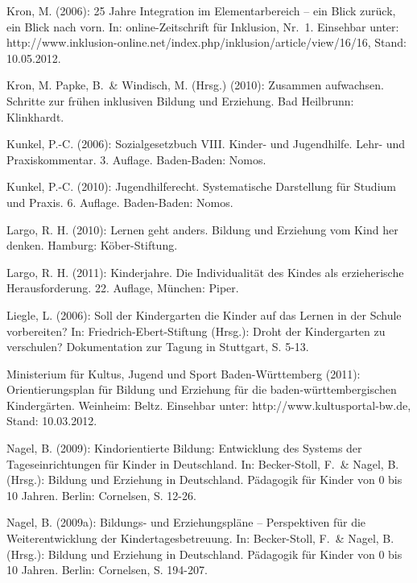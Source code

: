 Kron, M. (2006): 25 Jahre Integration im Elementarbereich – ein Blick zurück, ein Blick nach vorn. In: online-Zeitschrift für Inklusion, Nr.~1. Einsehbar unter: http://www.inklusion-online.net/index.php/inklusion/article/view/16/16, Stand: 10.05.2012.

Kron, M. Papke, B.~\& Windisch, M. (Hrsg.) (2010): Zusammen aufwachsen. Schritte zur frühen inklusiven Bildung und Erziehung. Bad Heilbrunn: Klinkhardt.

Kunkel, P.-C. (2006): Sozialgesetzbuch VIII. Kinder- und Jugendhilfe. Lehr- und Praxiskommentar. 3. Auflage. Baden-Baden: Nomos. 

Kunkel, P.-C. (2010): Jugendhilferecht. Systematische Darstellung für Studium und Praxis. 6. Auflage. Baden-Baden: Nomos. 

Largo, R. H. (2010): Lernen geht anders. Bildung und Erziehung vom Kind her denken. Hamburg: Köber-Stiftung. 

Largo, R. H. (2011): Kinderjahre. Die Individualität des Kindes als erzieherische Herausforderung. 22. Auflage, München: Piper.

Liegle, L. (2006): Soll der Kindergarten die Kinder auf das Lernen in der Schule vorbereiten? In: Friedrich-Ebert-Stiftung (Hrsg.): Droht der Kindergarten zu verschulen? Dokumentation zur Tagung in Stuttgart, S. 5-13.


Ministerium für Kultus, Jugend und Sport Baden-Württemberg (2011): Orientierungsplan für Bildung und Erziehung für die baden-württembergischen Kindergärten. Weinheim: Beltz. Einsehbar unter: http://www.kultusportal-bw.de, Stand: 10.03.2012.

Nagel, B. (2009): Kindorientierte Bildung: Entwicklung des Systems der Tageseinrichtungen für Kinder in Deutschland. In: Becker-Stoll, F.~\& Nagel, B. (Hrsg.): Bildung und Erziehung in Deutschland. Pädagogik für Kinder von 0 bis 10 Jahren. Berlin: Cornelsen, S. 12-26.

Nagel, B. (2009a): Bildungs- und Erziehungspläne – Perspektiven für die Weiterentwicklung der Kindertagesbetreuung. In: Becker-Stoll, F.~\& Nagel, B. (Hrsg.): Bildung und Erziehung in Deutschland. Pädagogik für Kinder von 0 bis 10 Jahren. Berlin: Cornelsen, S. 194-207.

